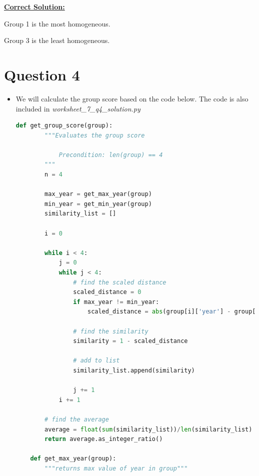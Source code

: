 \documentclass[12pt]{article}
\begin{document}
\bigskip

\begin{mdframed}
    \underline{\textbf{Correct Solution:}}

    \bigskip

    \color{red}
    Group 1 is the most homogeneous.

    \bigskip

    Group 3 is the least homogeneous.
    \color{black}

    \bigskip
\end{mdframed}

\bigskip

\section*{Question 4}
\begin{itemize}
    \item

    We will calculate the group score based on the code below. The code
    is also included in \textit{worksheet\_7\_q4\_solution.py}

    \bigskip

    \begin{lstlisting}[language=Python]
    def get_group_score(group):
        """Evaluates the group score

            Precondition: len(group) == 4
        """
        n = 4

        max_year = get_max_year(group)
        min_year = get_min_year(group)
        similarity_list = []

        i = 0

        while i < 4:
            j = 0
            while j < 4:
                # find the scaled distance
                scaled_distance = 0
                if max_year != min_year:
                    scaled_distance = abs(group[i]['year'] - group[j]['year']) / float(max_year - min_year)

                # find the similarity
                similarity = 1 - scaled_distance

                # add to list
                similarity_list.append(similarity)

                j += 1
            i += 1

        # find the average
        average = float(sum(similarity_list))/len(similarity_list)
        return average.as_integer_ratio()

    def get_max_year(group):
        """returns max value of year in group"""


\end{lstlisting}
\end{itemize}
\end{document}
